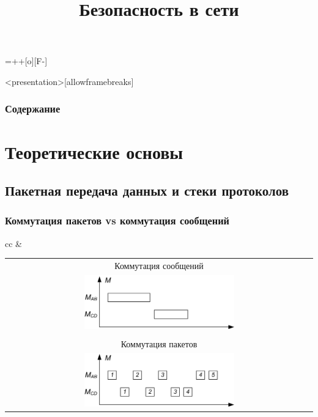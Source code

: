 
\usepackage[all]{xy}
\entrymodifiers={++[o][F-]}


\title[Безопасность в сети]{Безопасность в сети}




\begin{frame}<presentation>[allowframebreaks]
    \frametitle{Содержание}
    \tableofcontents
\end{frame}


\section{Теоретические основы}

\subsection{Пакетная передача данных и стеки протоколов}

\begin{frame}
    \frametitle{Коммутация пакетов vs коммутация сообщений}

    \begin{tabular}{cc}
            &
                \begin{tabular}{c}
                    Коммутация сообщений\\
                    \includegraphics[width=0.5\textwidth]{fig/message}\\
                    \\
                    Коммутация пакетов\\
                    \includegraphics[width=0.5\textwidth]{fig/packet}
                \end{tabular}
    \end{tabular}
\end{frame}


